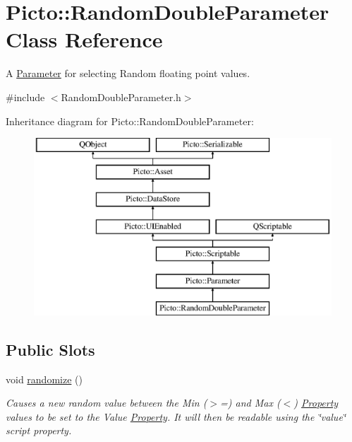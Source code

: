 \hypertarget{class_picto_1_1_random_double_parameter}{\section{Picto\-:\-:Random\-Double\-Parameter Class Reference}
\label{class_picto_1_1_random_double_parameter}
}


A \hyperlink{class_picto_1_1_parameter}{Parameter} for selecting Random floating point values.  




{\ttfamily \#include $<$Random\-Double\-Parameter.\-h$>$}

Inheritance diagram for Picto\-:\-:Random\-Double\-Parameter\-:\begin{figure}[H]
\begin{center}
\leavevmode
\includegraphics[height=6.632826cm]{class_picto_1_1_random_double_parameter}
\end{center}
\end{figure}
\subsection*{Public Slots}
\begin{DoxyCompactItemize}
\item 
\hypertarget{class_picto_1_1_random_double_parameter_a8de295a1b08b19b4c413419df42fe7e9}{void \hyperlink{class_picto_1_1_random_double_parameter_a8de295a1b08b19b4c413419df42fe7e9}{randomize} ()}\label{class_picto_1_1_random_double_parameter_a8de295a1b08b19b4c413419df42fe7e9}

\begin{DoxyCompactList}\small\item\em Causes a new random value between the Min ($>$=) and Max ($<$) \hyperlink{class_picto_1_1_property}{Property} values to be set to the Value \hyperlink{class_picto_1_1_property}{Property}. It will then be readable using the \char`\"{}value\char`\"{} script property. \end{DoxyCompactList}\end{DoxyCompactItemize}
